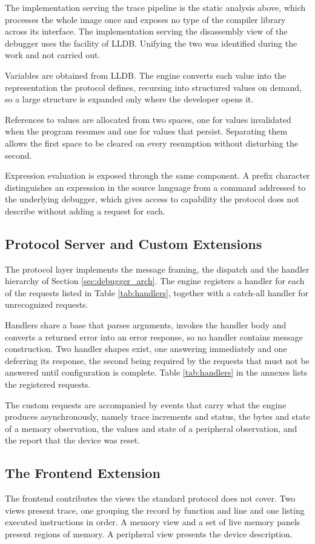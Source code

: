 The implementation serving the trace pipeline is the static analysis above, which processes the whole image once and exposes no type of the compiler library across its interface. The implementation serving the disassembly view of the debugger uses the facility of LLDB. Unifying the two was identified during the work and not carried out.

Variables are obtained from LLDB. The engine converts each value into the representation the protocol defines, recursing into structured values on demand, so a large structure is expanded only where the developer opens it.

References to values are allocated from two spaces, one for values invalidated when the program resumes and one for values that persist. Separating them allows the first space to be cleared on every resumption without disturbing the second.

Expression evaluation is exposed through the same component. A prefix character distinguishes an expression in the source language from a command addressed to the underlying debugger, which gives access to capability the protocol does not describe without adding a request for each.

\subsection{Protocol Server and Custom Extensions}
\label{subsec:variables_impl}
The protocol layer implements the message framing, the dispatch and the handler hierarchy of Section \ref{sec:debugger_arch}. The engine registers a handler for each of the requests listed in Table \ref{tab:handlers}, together with a catch-all handler for unrecognized requests.

Handlers share a base that parses arguments, invokes the handler body and converts a returned error into an error response, so no handler contains message construction. Two handler shapes exist, one answering immediately and one deferring its response, the second being required by the requests that must not be answered until configuration is complete. Table \ref{tab:handlers} in the annexes lists the registered requests.

The custom requests are accompanied by events that carry what the engine produces asynchronously, namely trace increments and status, the bytes and state of a memory observation, the values and state of a peripheral observation, and the report that the device was reset.

\subsection{The Frontend Extension}
The frontend contributes the views the standard protocol does not cover. Two views present trace, one grouping the record by function and line and one listing executed instructions in order. A memory view and a set of live memory panels present regions of memory. A peripheral view presents the device description.


